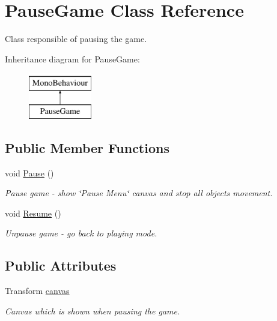 \hypertarget{class_pause_game}{}\section{Pause\+Game Class Reference}
\label{class_pause_game}


Class responsible of pausing the game.  


Inheritance diagram for Pause\+Game\+:\begin{figure}[H]
\begin{center}
\leavevmode
\includegraphics[height=2.000000cm]{class_pause_game}
\end{center}
\end{figure}
\subsection*{Public Member Functions}
\begin{DoxyCompactItemize}
\item 
void \mbox{\hyperlink{class_pause_game_a931478b9fc65d240b62a1cfa68607684}{Pause}} ()
\begin{DoxyCompactList}\small\item\em Pause game -\/ show \char`\"{}\+Pause Menu\char`\"{} canvas and stop all objects\textquotesingle{} movement. \end{DoxyCompactList}\item 
void \mbox{\hyperlink{class_pause_game_a70d2c89455ef1f1970d5fc7b791b7566}{Resume}} ()
\begin{DoxyCompactList}\small\item\em Unpause game -\/ go back to playing mode. \end{DoxyCompactList}\end{DoxyCompactItemize}
\subsection*{Public Attributes}
\begin{DoxyCompactItemize}
\item 
Transform \mbox{\hyperlink{class_pause_game_adf677814c2492d0887efd5ea18e6bba4}{canvas}}
\begin{DoxyCompactList}\small\item\em Canvas which is shown when pausing the game. \end{DoxyCompactList}\end{DoxyCompactItemize}
